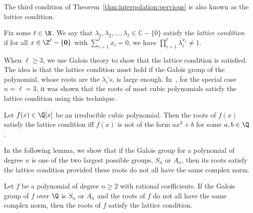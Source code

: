 \documentclass[11pt]{article}
\begin{document}
The third condition of Theorem~\ref{thm:interpolation:pervious} is also known as the lattice condition.

\begin{definition} \label{def:interpolation:lattice_condition}
 Fix some $\ell \in \N$.
 We say that $\lambda_1, \lambda_2, \dotsc, \lambda_\ell \in \mathbb{C} - \{0\}$ satisfy the \emph{lattice condition}
 if for all $x \in \Z^\ell - \{\mathbf{0}\}$ with $\sum_{i=1}^\ell x_i = 0$,
 we have $\prod_{i=1}^\ell \lambda_i^{x_i} \ne 1$.
\end{definition}

When $\ell \ge 3$,
we use Galois theory to show that the lattice condition is satisfied.
The idea is that the lattice condition must hold if the Galois group of the polynomial,
whose roots are the $\lambda_i$'s,
is large enough.
In~\cite{CLX12}, for the special case $n = \ell = 3$,
it was shown that the roots of most cubic polynomials satisfy the lattice condition using this technique.

\begin{lemma} \label{lem:interpolation:lattice_condition:cubic}
 Let $f(x) \in \Q[x]$ be an irreducible cubic polynomial.
 Then the roots of $f(x)$ satisfy the lattice condition iff $f(x)$ is not of the form $a x^3 + b$ for some $a,b \in \Q$.
\end{lemma}

In the following lemma, 
we show that if the Galois group for a polynomial of degree $n$ is one of the two largest possible groups, $S_n$ or $A_n$,
then its roots satisfy the lattice condition provided these roots do not all have the same complex norm.

\begin{lemma} \label{lem:lattice_condition:Sn_An}
 Let $f$ be a polynomial of degree $n \ge 2$ with rational coefficients.
 If the Galois group of $f$ over $\Q$ is $S_n$ or $A_n$ and the roots of $f$ do not all have the same complex norm,
 then the roots of $f$ satisfy the lattice condition.
\end{lemma}
\end{document}

